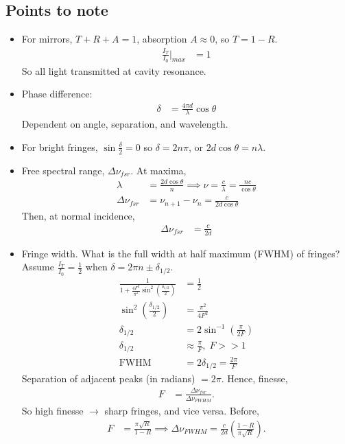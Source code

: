\documentclass[a4paper, 11pt, normalem]{report}
\begin{document}
\subsection{Points to note}
\begin{itemize}
    \item For mirrors, $T+R+A = 1$, absorption $A\approx0$, so $T=1-R$.
        \begin{align}
            \frac{I_T}{I_0}\bigg|_{max} &= 1
        \end{align}
        So all light transmitted at cavity resonance.
    \item Phase difference:
        \begin{align}
            \delta &= \frac{4\pi d}{\lambda}\cos\theta
        \end{align}
        Dependent on angle, separation, and wavelength.
    \item For bright fringes, $\sin\frac{\delta}{2}=0$ so $\delta=2n\pi$, or $2d\cos\theta = n\lambda$.
    \item Free spectral range, $\Delta\nu_{fsr}$. At maxima,
        \begin{align}
            \lambda &= \frac{2d\cos\theta}{n} \implies \nu = \frac{c}{\lambda} = \frac{nc}{\cos\theta} \\
            \Delta\nu_{fsr} &= \nu_{n+1}-\nu_n = \frac{c}{2d\cos\theta}
        \end{align}
        Then, at normal incidence,
        \begin{align}
            \Delta\nu_{fsr} &= \frac{c}{2d}
        \end{align}
    \item Fringe width. What is the full width at half maximum (FWHM) of fringes? Assume $\frac{I_T}{I_0}=\frac12$ when $\delta=2\pi n\pm\delta_{1/2}$.
        \begin{align}
            \frac{1}{1+\frac{4F^2}{\pi^2}\sin^2(\frac{\delta_{1/2}}{2})} &= \frac12\\
            \sin^2\left(\frac{\delta_{1/2}}{2}\right) &= \frac{\pi^2}{4F^2} \\
            \delta_{1/2} &= 2\sin^{-1}\left(\frac{\pi}{2F}\right) \\
            \delta_{1/2} &\approx \frac{\pi}{F},\; F >> 1 \\
            \text{FWHM} &= 2\delta_{1/2} = \frac{2\pi}{F}
        \end{align}
        Separation of adjacent peaks (in radians) $=2\pi$.
        Hence, finesse,
        \begin{align}
            F &= \frac{\Delta\nu_{fsr}}{\Delta\nu_{FWHM}}.
        \end{align}
        So high finesse $\to$ sharp fringes, and vice versa.
        Before,
        \begin{align}
            F &= \frac{\pi\sqrt{R}}{1-R} \implies \Delta\nu_{FWHM} = \frac{c}{2d}\left(\frac{1-R}{\pi\sqrt{R}}\right).
        \end{align}
\end{itemize}
\end{document}
